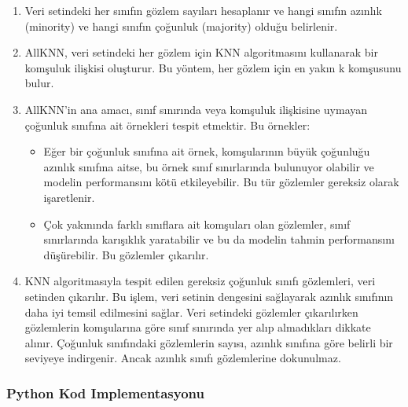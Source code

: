 \begin{enumerate}
    \item Veri setindeki her sınıfın gözlem sayıları hesaplanır ve hangi sınıfın azınlık (minority) ve hangi sınıfın çoğunluk (majority) olduğu belirlenir.
    \item AllKNN, veri setindeki her gözlem için KNN algoritmasını kullanarak bir komşuluk ilişkisi oluşturur. Bu yöntem, her gözlem için en yakın k komşusunu bulur.
    \item AllKNN’in ana amacı, sınıf sınırında veya komşuluk ilişkisine uymayan çoğunluk sınıfına ait örnekleri tespit etmektir. Bu örnekler:
    \begin{itemize}
        \item Eğer bir çoğunluk sınıfına ait örnek, komşularının büyük çoğunluğu azınlık sınıfına aitse, bu örnek sınıf sınırlarında bulunuyor olabilir ve modelin performansını kötü etkileyebilir. Bu tür gözlemler gereksiz olarak işaretlenir.
        \item Çok yakınında farklı sınıflara ait komşuları olan gözlemler, sınıf sınırlarında karışıklık yaratabilir ve bu da modelin tahmin performansını düşürebilir. Bu gözlemler çıkarılır.
    \end{itemize}
    \item KNN algoritmasıyla tespit edilen gereksiz çoğunluk sınıfı gözlemleri, veri setinden çıkarılır. Bu işlem, veri setinin dengesini sağlayarak azınlık sınıfının daha iyi temsil edilmesini sağlar. Veri setindeki gözlemler çıkarılırken gözlemlerin komşularına göre sınıf sınırında yer alıp almadıkları dikkate alınır. Çoğunluk sınıfındaki gözlemlerin sayısı, azınlık sınıfına göre belirli bir seviyeye indirgenir. Ancak azınlık sınıfı gözlemlerine dokunulmaz.
\end{enumerate}

\subsubsection{Python Kod Implementasyonu}

